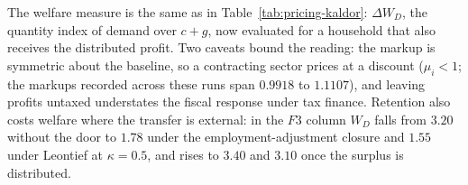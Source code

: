 The welfare measure is the same as in Table~\ref{tab:pricing-kaldor}: $\Delta W_D$, the
quantity index of demand over $c+g$, now evaluated for a household that also
receives the distributed profit. Two caveats bound the reading: the markup is
symmetric about the baseline, so a contracting sector prices at a discount
($\mu_i < 1$; the markups recorded across these runs span $0.9918$ to $1.1107$),
and leaving profits untaxed understates the fiscal response under tax finance. Retention also costs welfare where the transfer is external: in the $F3$ column $W_D$ falls from $3.20$ without the door to $1.78$ under the employment-adjustment closure and $1.55$ under Leontief at $\kappa = 0.5$, and rises to $3.40$ and $3.10$ once the surplus is distributed.


